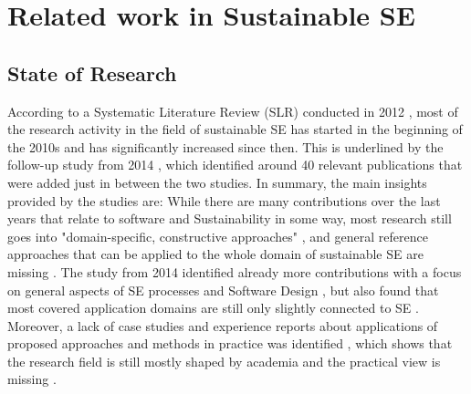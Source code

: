 \documentclass[oribibl]{llncs}
\begin{document}
\section{Related work in Sustainable SE} 
\subsection{State of Research\label{stateOfResearch}} %
According to a Systematic Literature Review (SLR) conducted in 2012 \cite{penzenstadler_sustainability_2012}, most of the research activity in the field of sustainable SE has started in the beginning of the 2010s and has significantly increased since then. This is underlined by the follow-up study from 2014 \cite{penzenstadler_systematic_2014}, which identified around 40 relevant publications that were added just in between the two studies. In summary, the main insights provided by the studies are: While there are many contributions over the last years that relate to software and Sustainability in some way, most research still goes into "domain-specific, constructive approaches" \cite[p.\,5]{penzenstadler_sustainability_2012}, and general reference approaches that can be applied to the whole domain of sustainable SE are missing \cite{penzenstadler_sustainability_2012}. The study from 2014 identified already more contributions with a focus on general aspects of SE processes and Software Design \cite{penzenstadler_systematic_2014}, but also found that most covered application domains are still only slightly connected to SE \cite{penzenstadler_systematic_2014}. Moreover, a lack of case studies and experience reports about applications of proposed approaches and methods in practice was identified \cite{penzenstadler_sustainability_2012}, which shows that the research field is still mostly shaped by academia and the practical view is missing \cite{penzenstadler_systematic_2014}.\\
\end{document}
